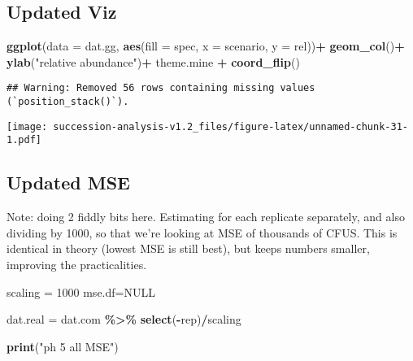 \documentclass[
]{article}
\newenvironment{Shaded}{\begin{snugshade}}{\end{snugshade}}
\newcommand{\AttributeTok}[1]{\textcolor[rgb]{0.13,0.29,0.53}{#1}}
\newcommand{\ConstantTok}[1]{\textcolor[rgb]{0.56,0.35,0.01}{#1}}
\newcommand{\DecValTok}[1]{\textcolor[rgb]{0.00,0.00,0.81}{#1}}
\newcommand{\FunctionTok}[1]{\textcolor[rgb]{0.13,0.29,0.53}{\textbf{#1}}}
\newcommand{\NormalTok}[1]{#1}
\newcommand{\OtherTok}[1]{\textcolor[rgb]{0.56,0.35,0.01}{#1}}
\newcommand{\SpecialCharTok}[1]{\textcolor[rgb]{0.81,0.36,0.00}{\textbf{#1}}}
\newcommand{\StringTok}[1]{\textcolor[rgb]{0.31,0.60,0.02}{#1}}
\begin{document}
\hypertarget{updated-viz}{%
\subsection{Updated Viz}\label{updated-viz}}

\begin{Shaded}
\begin{Highlighting}[]
\FunctionTok{ggplot}\NormalTok{(}\AttributeTok{data =}\NormalTok{ dat.gg, }\FunctionTok{aes}\NormalTok{(}\AttributeTok{fill =}\NormalTok{ spec, }\AttributeTok{x =}\NormalTok{ scenario, }\AttributeTok{y =}\NormalTok{ rel))}\SpecialCharTok{+}
  \FunctionTok{geom\_col}\NormalTok{()}\SpecialCharTok{+}
  \FunctionTok{ylab}\NormalTok{(}\StringTok{"relative abundance"}\NormalTok{)}\SpecialCharTok{+}
\NormalTok{  theme.mine }\SpecialCharTok{+}
  \FunctionTok{coord\_flip}\NormalTok{()}
\end{Highlighting}
\end{Shaded}

\begin{verbatim}
## Warning: Removed 56 rows containing missing values (`position_stack()`).
\end{verbatim}

\texttt{[image: succession-analysis-v1.2\_files/figure-latex/unnamed-chunk-31-1.pdf]}

\hypertarget{updated-mse}{%
\subsection{Updated MSE}\label{updated-mse}}

Note: doing 2 fiddly bits here. Estimating for each replicate
separately, and also dividing by 1000, so that we're looking at MSE of
thousands of CFUS. This is identical in theory (lowest MSE is still
best), but keeps numbers smaller, improving the practicalities.

\begin{Shaded}
\begin{Highlighting}[]
\NormalTok{scaling }\OtherTok{=} \DecValTok{1000}
\NormalTok{mse.df}\OtherTok{=}\ConstantTok{NULL}

\NormalTok{dat.real }\OtherTok{=}\NormalTok{ dat.com }\SpecialCharTok{\%\textgreater{}\%}  \FunctionTok{select}\NormalTok{(}\SpecialCharTok{{-}}\NormalTok{rep)}\SpecialCharTok{/}\NormalTok{scaling}

\FunctionTok{print}\NormalTok{(}\StringTok{"ph 5 all MSE"}\NormalTok{)}
\end{Highlighting}
\end{Shaded}
\end{document}
